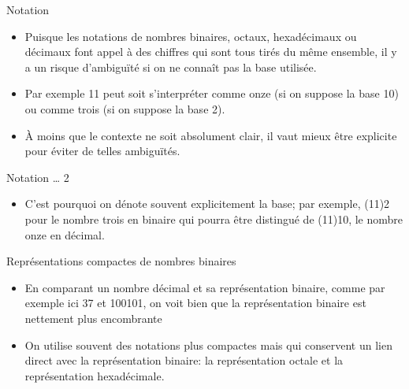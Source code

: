 \documentclass[presentation]{beamer}
\begin{document}
\begin{frame}[label={sec:org0c4d459}]{Notation}
\begin{itemize}
\item Puisque les notations de nombres binaires, octaux, hexadécimaux ou décimaux font appel à des chiffres qui sont tous tirés du même ensemble, il y a un risque d'ambiguïté si on ne connaît pas la base utilisée.

\item Par exemple 11 peut soit s'interpréter comme onze (si on suppose la base 10) ou comme trois (si on suppose la base 2).

\item À moins que le contexte ne soit absolument clair, il vaut mieux être explicite pour éviter de telles ambiguïtés.
\end{itemize}
\end{frame}

\begin{frame}[label={sec:orge547b58}]{Notation \ldots{} 2}
\begin{itemize}
\item C'est pourquoi on dénote souvent explicitement la base; par exemple, (11)2 pour le nombre trois en binaire qui pourra être distingué de (11)10, le nombre onze en décimal.
\end{itemize}
\end{frame}

\begin{frame}[label={sec:orgd97b969}]{Représentations compactes de nombres binaires}
\begin{itemize}
\item En comparant un nombre décimal et sa représentation binaire, comme par exemple ici 37 et 100101, on voit bien que la représentation binaire est nettement plus encombrante

\item On utilise souvent des notations plus compactes mais qui conservent un lien direct avec la représentation binaire: la représentation \alert{octale} et la représentation \alert{hexadécimale}.
\end{itemize}
\end{frame}
\end{document}
